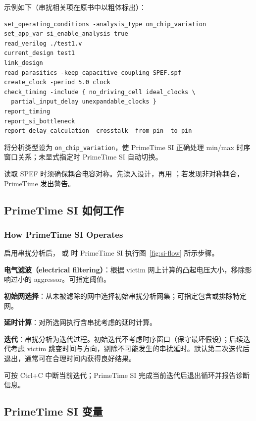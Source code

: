 示例如下（串扰相关项在原书中以粗体标出）：
\begin{lstlisting}
set_operating_conditions -analysis_type on_chip_variation
set_app_var si_enable_analysis true
read_verilog ./test1.v
current_design test1
link_design
read_parasitics -keep_capacitive_coupling SPEF.spf
create_clock -period 5.0 clock
check_timing -include { no_driving_cell ideal_clocks \
  partial_input_delay unexpandable_clocks }
report_timing
report_si_bottleneck
report_delay_calculation -crosstalk -from pin -to pin
\end{lstlisting}

 将分析类型设为 \texttt{on\_chip\_variation}，使 PrimeTime SI 正确处理 min/max 时序窗口关系；未显式指定时 PrimeTime SI 自动切换。

读取 SPEF 时须确保耦合电容对称。先读入设计，再用 ；若发现非对称耦合，PrimeTime 发出警告。

\subsection{PrimeTime SI 如何工作}
\subsubsection*{How PrimeTime SI Operates}

启用串扰分析后， 或  时 PrimeTime SI 执行图~\ref{fig:si-flow} 所示步骤。


\textbf{电气滤波（electrical filtering）}：根据 victim 网上计算的凸起电压大小，移除影响过小的 aggressor。可指定阈值。

\textbf{初始网选择}：从未被滤除的网中选择初始串扰分析网集；可指定包含或排除特定网。

\textbf{延时计算}：对所选网执行含串扰考虑的延时计算。

\textbf{迭代}：串扰分析为迭代过程。初始迭代不考虑时序窗口（保守最坏假设）；后续迭代考虑 victim 跳变时间与方向，剔除不可能发生的串扰延时。默认第二次迭代后退出，通常可在合理时间内获得良好结果。

可按 Ctrl+C 中断当前迭代；PrimeTime SI 完成当前迭代后退出循环并报告诊断信息。

\subsection{PrimeTime SI 变量}
